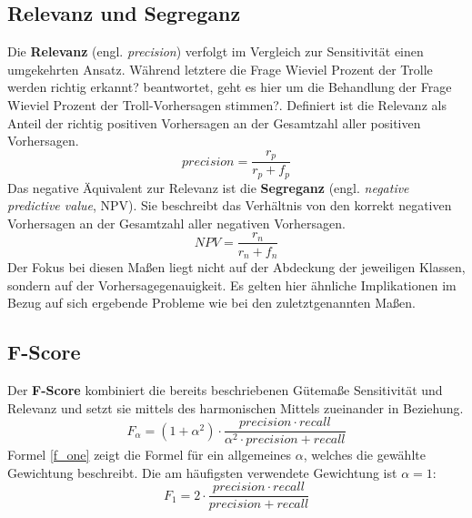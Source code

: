 \subsection{Relevanz und Segreganz}
Die \textbf{Relevanz} (engl. \textit{precision}) verfolgt im Vergleich zur Sensitivität einen umgekehrten Ansatz. Während letztere die Frage \glqq Wieviel Prozent der Trolle werden richtig erkannt?\grqq{} beantwortet, geht es hier um die Behandlung der Frage \glqq Wieviel Prozent der Troll-Vorhersagen stimmen?\grqq{}. Definiert ist die Relevanz als Anteil der richtig positiven Vorhersagen an der Gesamtzahl aller positiven Vorhersagen.
\begin{equation}
precision = \frac{r_p}{r_p + f_p}
\end{equation}
Das negative Äquivalent zur Relevanz ist die \textbf{Segreganz} (engl. \textit{negative predictive value}, NPV). Sie beschreibt das Verhältnis von den korrekt negativen Vorhersagen an der Gesamtzahl aller negativen Vorhersagen.
\begin{equation}
NPV = \frac{r_n}{r_n + f_n}
\end{equation}
Der Fokus bei diesen Maßen liegt nicht auf der Abdeckung der jeweiligen Klassen, sondern auf der Vorhersagegenauigkeit. Es gelten hier ähnliche Implikationen im Bezug auf sich ergebende Probleme wie bei den zuletztgenannten Maßen.
\subsection{F-Score}
Der \textbf{F-Score} kombiniert die bereits beschriebenen Gütemaße Sensitivität und Relevanz und setzt sie mittels des harmonischen Mittels zueinander in Beziehung.
\begin{equation}
	F_\alpha = (1 + \alpha^2) \cdot \frac{precision \cdot recall}{\alpha^2 \cdot precision + recall}
	\label{f_one}
\end{equation}
Formel \ref{f_one} zeigt die Formel für ein allgemeines $\alpha$, welches die gewählte Gewichtung beschreibt. Die am häufigsten verwendete Gewichtung ist $\alpha = 1$:
\begin{equation}
	F_1 = 2 \cdot \frac{precision \cdot recall}{precision + recall}
\end{equation}
\pagebreak